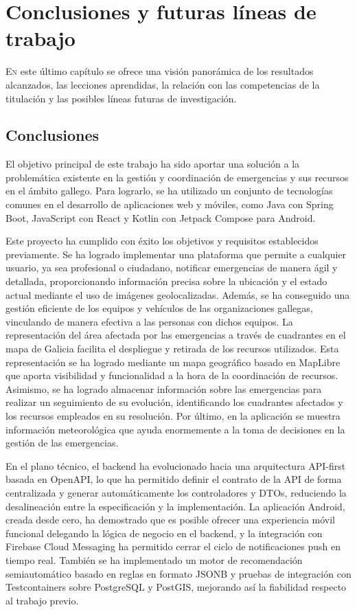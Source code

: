 \chapter{Conclusiones y futuras líneas de trabajo}
\label{chap:conclusions}

\lettrine{E}{n} este último capítulo se ofrece una visión panorámica de los resultados alcanzados, las lecciones aprendidas, la relación con las competencias de la titulación y las posibles líneas futuras de investigación.

\section{Conclusiones}
\label{sec:conclusions}

El objetivo principal de este trabajo ha sido aportar una solución a la problemática existente en la gestión y coordinación de emergencias y sus recursos en el ámbito gallego. Para lograrlo, se ha utilizado un conjunto de tecnologías comunes en el desarrollo de aplicaciones web y móviles, como Java con Spring Boot, JavaScript con React y Kotlin con Jetpack Compose para Android.

Este proyecto ha cumplido con éxito los objetivos y requisitos establecidos previamente. Se ha logrado implementar una plataforma que permite a cualquier usuario, ya sea profesional o ciudadano, notificar emergencias de manera ágil y detallada, proporcionando información precisa sobre la ubicación y el estado actual mediante el uso de imágenes geolocalizadas. Además, se ha conseguido una gestión eficiente de los equipos y vehículos de las organizaciones gallegas, vinculando de manera efectiva a las personas con dichos equipos. La representación del área afectada por las emergencias a través de cuadrantes en el mapa de Galicia facilita el despliegue y retirada de los recursos utilizados. Esta representación se ha logrado mediante un mapa geográfico basado en MapLibre que aporta visibilidad y funcionalidad a la hora de la coordinación de recursos. Asimismo, se ha logrado almacenar información sobre las emergencias para realizar un seguimiento de su evolución, identificando los cuadrantes afectados y los recursos empleados en su resolución. Por último, en la aplicación se muestra información meteorológica que ayuda enormemente a la toma de decisiones en la gestión de las emergencias.

En el plano técnico, el backend ha evolucionado hacia una arquitectura API-first basada en OpenAPI, lo que ha permitido definir el contrato de la API de forma centralizada y generar automáticamente los controladores y DTOs, reduciendo la desalineación entre la especificación y la implementación. La aplicación Android, creada desde cero, ha demostrado que es posible ofrecer una experiencia móvil funcional delegando la lógica de negocio en el backend, y la integración con Firebase Cloud Messaging ha permitido cerrar el ciclo de notificaciones push en tiempo real. También se ha implementado un motor de recomendación semiautomático basado en reglas en formato JSONB y pruebas de integración con Testcontainers sobre PostgreSQL y PostGIS, mejorando así la fiabilidad respecto al trabajo previo.

